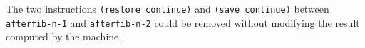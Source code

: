 \documentclass[a4paper,12pt]{article}
\begin{document}
The two instructions \lstinline!(restore continue)! and
\lstinline!(save continue)! between \lstinline!afterfib-n-1! and
\lstinline!afterfib-n-2! could be removed without modifying the result
computed by the machine.
\end{document}
